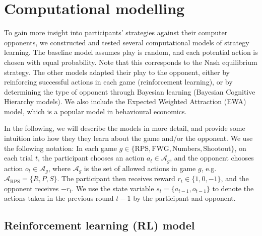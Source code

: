 \documentclass[
  english,
  man,floatsintext]{apa6}
\begin{document}
\hypertarget{computational-modelling}{%
\section{Computational modelling}\label{computational-modelling}}

To gain more insight into participants' strategies against their computer opponents, we constructed and tested several computational models of strategy learning. The baseline model assumes play is random, and each potential action is chosen with equal probability. Note that this corresponds to the Nash equilibrium strategy. The other models adapted their play to the opponent, either by reinforcing successful actions in each game (reinforcement learning), or by determining the type of opponent through Bayesian learning (Bayesian Cognitive Hierarchy models). We also include the Expected Weighted Attraction (EWA) model, which is a popular model in behavioural economics.

In the following, we will describe the models in more detail, and provide some intuition into how they they learn about the game and/or the opponent. We use the following notation: In each game \(g \in \{\text{RPS},\text{FWG}, \text{Numbers}, \text{Shootout} \}\), on each trial \(t\), the participant chooses an action \(a_t \in \mathcal{A}_g\), and the opponent chooses action \(o_t \in \mathcal{A}_g\), where \(\mathcal{A}_g\) is the set of allowed actions in game \(g\), e.g.~\(\mathcal{A}_\text{RPS} = \{R,P,S\}\). The participant then receives reward \(r_t \in \{1,0,-1\}\), and the opponent receives \(-r_t\). We use the state variable \(s_t = \{a_{t-1},o_{t-1}\}\) to denote the actions taken in the previous round \(t-1\) by the participant and opponent.

\hypertarget{reinforcement-learning-rl-model}{%
\subsection{Reinforcement learning (RL) model}\label{reinforcement-learning-rl-model}}
\end{document}
